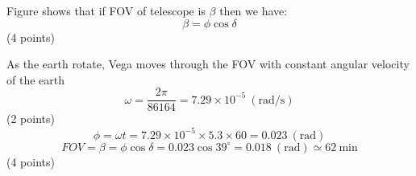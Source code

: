 
Figure shows that if FOV of telescope is $\beta$ then we have:
\[ \beta = \phi\cos\delta \]
\hfill(4 points)

As the earth rotate, Vega moves through the FOV with constant angular
velocity of the earth
\[
\omega = \frac{2\pi}{86164} = 7.29 \times 10^{-5}\ (\mathrm{rad/s})
\]
\hfill(2 points)
\[
\phi = \omega t = 7.29 \times 10^{-5} \times 5.3 \times 60 = 0.023\ \mathrm{(rad)}
\]
\[
FOV = \beta = \phi\cos\delta = 0.023\cos 39^\circ
 = 0.018\ \mathrm{(rad)} \simeq 62\ \mathrm{min}
\]
\hfill(4 points)
